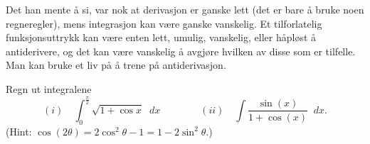 \documentclass[a4paper,norsk,11pt]{interaktiv}
\newcommand{\dee}{\mathop{}\!{d}}
\begin{document}
Det han mente å si, 
var nok at derivasjon er ganske lett (det er bare å bruke noen regneregler),
mens integrasjon kan være ganske vanskelig. 
Et tilforlatelig funksjonsuttrykk kan være enten lett, umulig, vanskelig, eller håpløst å antiderivere,
og det kan være vanskelig å avgjøre hvilken av disse som er tilfelle. 
Man kan bruke et liv på å trene på antiderivasjon.

\begin{oppgave}{3}
  Regn ut integralene
  \begin{equation*}
    (i) \quad \int_0^{\frac{\pi}{2}} \sqrt{1 + \cos x} \dee x \qquad
    \qquad (ii) \quad \int\frac{\sin\left( x \right)}{1+\cos\left( x
      \right)} \dee x.
  \end{equation*}
  (Hint: $\cos(2\theta) = 2\cos^2 \theta -1 = 1 - 2 \sin^2 \theta$.)
\end{oppgave}
\end{document}
